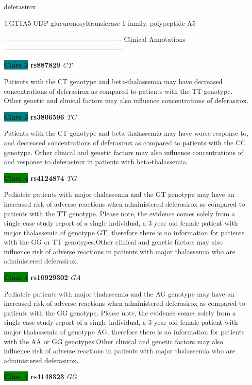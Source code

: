 \documentclass{resume} %
\begin{document}
\begin{rSection}{ deferasirox }
\begin{rSubsection}{ UGT1A5 }{ UDP glucuronosyltransferase 1 family, polypeptide A5 }{}{}
\item[] ---------------------------------------------------- Clinical Annotations -----------------------------------------------------\newline
\item \textbf{\colorbox{teal} {Class 3}} \textbf{ rs887829 } \textit{ CT }
\item[] Patients with the CT genotype and beta-thalassemia may have decreased concentrations of deferasirox as compared to patients with the TT genotype. Other genetic and clinical factors may also influence concentrations of deferasirox.\item \textbf{\colorbox{teal} {Class 3}} \textbf{ rs3806596 } \textit{ TC }
\item[] Patients with the CT genotype and beta-thalassemia may have worse response to, and decreased concentrations of deferasirox as compared to patients with the CC genotype. Other clinical and genetic factors may also influence concentrations of and response to deferasirox in patients with beta-thalassemia.\item \textbf{\colorbox{green} {Class 4}} \textbf{ rs4124874 } \textit{ TG }
\item[] Pediatric patients with major thalassemia and the GT genotype may have an increased risk of adverse reactions when administered deferasirox as compared to patients with the TT genotype. Please note, the evidence comes solely from a single case study report of a single individual, a 3 year old female patient with major thalassemia of genotype GT, therefore there is no information for patients with the GG or TT genotypes.Other clinical and genetic factors may also influence risk of adverse reactions in patients with major thalassemia who are administered deferasirox. \item \textbf{\colorbox{green} {Class 4}} \textbf{ rs10929302 } \textit{ GA }
\item[] Pediatric patients with major thalassemia and the AG genotype may have an increased risk of adverse reactions when administered deferasirox as compared to patients with the GG genotype. Please note, the evidence comes solely from a single case study report of a single individual, a 3 year old female patient with major thalassemia of genotype AG, therefore there is no information for patients with the AA or GG genotypes.Other clinical and genetic factors may also influence risk of adverse reactions in patients with major thalassemia who are administered deferasirox.\item \textbf{\colorbox{green} {Class 4}} \textbf{ rs4148323 } \textit{ GG }

\end{rSubsection}
\end{rSection}
\end{document}
